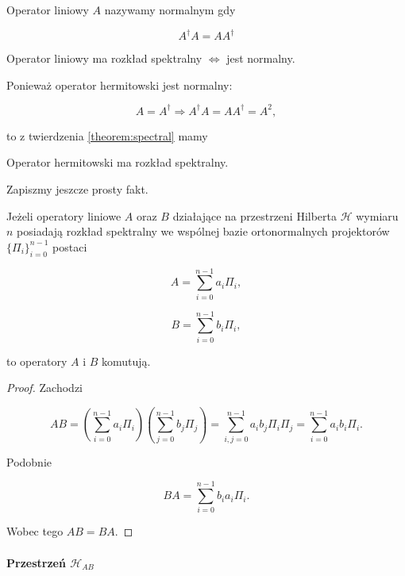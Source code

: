 \begin{definition}
    Operator liniowy $A$ nazywamy normalnym gdy

    $$
        A ^ {\dag} A = A A ^ {\dag}
    $$
\end{definition}

\begin{theorem}
    \label{theorem:spectral}
    Operator liniowy ma rozkład spektralny $\Leftrightarrow$ jest normalny.
\end{theorem}

Ponieważ operator hermitowski jest normalny:

$$
    A = A ^ {\dag} \Longrightarrow A ^ {\dag} A = A A ^ {\dag} = A ^ 2,
$$

to z twierdzenia \ref{theorem:spectral} mamy

\begin{corollary}
    \label{corollary:hermitian}
    Operator hermitowski ma rozkład spektralny.
\end{corollary}

Zapiszmy jeszcze prosty fakt.

\begin{fact}
    Jeżeli operatory liniowe $A$ oraz $B$ działające na przestrzeni Hilberta $\mathcal{H}$ wymiaru $n$ posiadają rozkład spektralny we wspólnej bazie ortonormalnych projektorów $\{\Pi_{i}\}_{i = 0} ^ {n - 1}$ postaci

    $$
        A = \sum\limits_{i = 0} ^ {n - 1} a_{i} \Pi_{i},
    $$

    $$
        B = \sum\limits_{i = 0} ^ {n - 1} b_{i} \Pi_{i},
    $$

    to operatory $A$ i $B$ komutują.
\end{fact}

\begin{proof}
    Zachodzi

    $$
        A B = \left(\sum\limits_{i = 0} ^ {n - 1} a_{i} \Pi_{i}\right) \left(\sum\limits_{j = 0} ^ {n - 1} b_{j} \Pi_{j}\right) = \sum\limits_{i, j = 0} ^ {n - 1} a_{i} b_{j} \Pi_{i} \Pi_{j} = \sum\limits_{i = 0} ^ {n - 1} a_{i} b_{i} \Pi_{i}.
    $$

    Podobnie

    $$
        B A = \sum\limits_{i = 0} ^ {n - 1} b_{i} a_{i} \Pi_{i}.
    $$

    Wobec tego $A B = B A$.
\end{proof}

\paragraph{Przestrzeń $\mathcal{H}_{AB}$}

